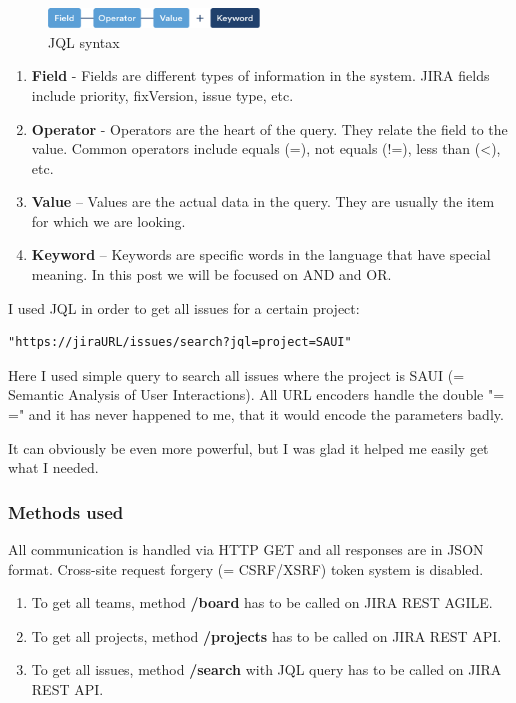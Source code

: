 \begin{figure}[!ht]
	\centering
	\includegraphics[width=0.5\textwidth]{figures/jql}
    \caption{JQL syntax}
\end{figure}

\begin{enumerate}
	\item {\bf Field} - Fields are different types of information in the system. JIRA fields include priority, fixVersion, issue type, etc.
	\item {\bf Operator} - Operators are the heart of the query. They relate the field to the value. Common operators include equals (=), not equals (!=), less than (<), etc.
	\item {\bf Value} – Values are the actual data in the query. They are usually the item for which we are looking.
	\item {\bf Keyword} – Keywords are specific words in the language that have special meaning. In this post we will be focused on AND and OR.
\end{enumerate}

I used JQL in order to get all issues for a certain project:

\begin{lstlisting}
"https://jiraURL/issues/search?jql=project=SAUI"
\end{lstlisting}

Here I used simple query to search all issues where the project is SAUI (= Semantic Analysis of User Interactions). All URL encoders handle the double "= =" and it has never happened to me, that it would encode the parameters badly.

It can obviously be even more powerful, but I was glad it helped me easily get what I needed.

\subsubsection{Methods used}

All communication is handled via HTTP GET and all responses are in JSON format. Cross-site request forgery (= CSRF/XSRF) token system is disabled.

\begin{enumerate}
	\item To get all teams, method {\bf /board} has to be called on JIRA REST AGILE.
	\item To get all projects, method {\bf /projects} has to be called on JIRA REST API.
	\item To get all issues, method {\bf /search} with JQL query has to be called on JIRA REST API.
\end{enumerate}

